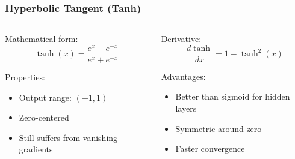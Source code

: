 \documentclass{beamer}
\begin{document}
\begin{frame}
\frametitle{Hyperbolic Tangent (Tanh)}
\begin{columns}
\begin{column}{0.5\textwidth}
Mathematical form:
\begin{equation}
\tanh(x) = \frac{e^x - e^{-x}}{e^x + e^{-x}}
\end{equation}

Properties:
\begin{itemize}
    \item Output range: $(-1, 1)$
    \item Zero-centered
    \item Still suffers from vanishing gradients
\end{itemize}
\end{column}
\begin{column}{0.5\textwidth}
Derivative:
\begin{equation}
\frac{d\tanh}{dx} = 1 - \tanh^2(x)
\end{equation}

Advantages:
\begin{itemize}
    \item Better than sigmoid for hidden layers
    \item Symmetric around zero
    \item Faster convergence
\end{itemize}
\end{column}
\end{columns}
\end{frame}
\end{document}

